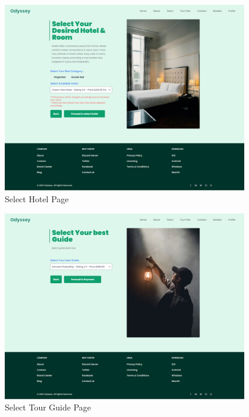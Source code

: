 \begin{figure}[H]
    \centering
    \includegraphics[width=0.95\textwidth]{./figures/frontend/6.png}
    \caption{Select Hotel Page}
    \label{fig:select_hotel}
\end{figure}

\begin{figure}[H]
    \centering
    \includegraphics[width=0.95\textwidth]{./figures/frontend/7.png}
    \caption{Select Tour Guide Page}
    \label{fig:select_guide}
\end{figure}

